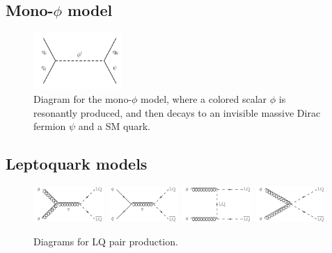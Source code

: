 \subsection {Mono-$\phi$ model}

\begin{figure}[htbp]
  \centering
    \includegraphics[width=0.3\textwidth]{figs/results/monoPhi.pdf}
    \caption{Diagram for the mono-$\phi$ model, where a colored scalar $\phi$ is resonantly produced, and then
      decays to an invisible massive Dirac fermion $\psi$ and a SM quark.}
    \label{fig:SMS_monophi}
\end{figure}

\subsection {Leptoquark models}

\begin{figure}[htbp]
  \centering
    \includegraphics[width=0.24\textwidth]{figs/results/LQdiagram_a.pdf}
    \includegraphics[width=0.24\textwidth]{figs/results/LQdiagram_b.pdf}
    \includegraphics[width=0.24\textwidth]{figs/results/LQdiagram_c.pdf}
    \includegraphics[width=0.24\textwidth]{figs/results/LQdiagram_d.pdf}
    \vspace{3mm}
    \caption{Diagrams for LQ pair production.}
    \label{fig:SMS_LQ}
\end{figure}
